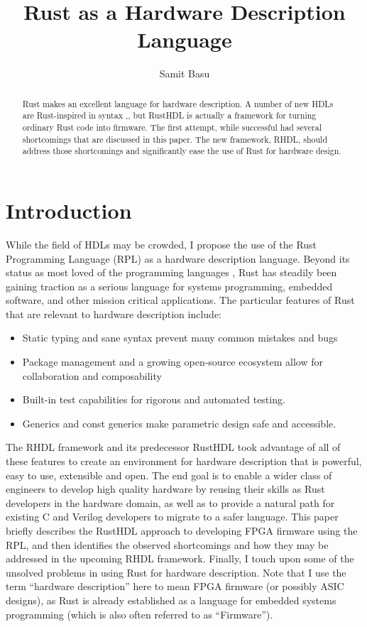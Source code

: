 \documentclass[sigplan,screen,sigconf]{acmart}
\author{Samit Basu}
\affiliation{
  basu.samit@gmail.com
  \country{Fremont CA, USA}
}
\begin{document}
\title{Rust as a Hardware Description Language}

\begin{abstract}
Rust \cite{b9} makes an excellent language for hardware description.  A number of new HDLs are 
Rust-inspired in syntax \cite{b1},\cite{b4},
but RustHDL\cite{b6} is actually a framework for turning ordinary Rust code into firmware.  The first attempt,
while successful had several shortcomings that are discussed in this paper.  The new framework, RHDL\cite{b10},
should address those shortcomings and significantly ease the use of Rust for hardware design.
\end{abstract}

\maketitle

\section{Introduction}

While the field of HDLs may be crowded, I propose the use of the Rust Programming Language (RPL)
as a hardware description language.  Beyond its status as most loved of the programming languages \cite{b0},
Rust has steadily been gaining traction as a serious language for systems programming, embedded 
software, and other mission critical applications.  The particular features of Rust that are 
relevant to hardware description include:
\begin{itemize}
\item Static typing and sane syntax prevent many common mistakes and bugs
\item Package management and a growing open-source ecosystem allow for collaboration and composability
\item Built-in test capabilities for rigorous and automated testing.
\item Generics and const generics make parametric design safe and accessible.
\end{itemize}
The RHDL framework and its predecessor RustHDL took advantage of all of these features to
create an environment for hardware description that is powerful, easy to use, extensible and
open.  The end goal is to enable a wider class of engineers to develop high quality hardware
by reusing their skills as Rust developers in the hardware domain, as well as to provide a natural path for existing C and Verilog developers to migrate to a safer language.  This paper briefly describes
the RustHDL approach to developing FPGA firmware using the RPL, and then identifies the
observed shortcomings and how they may be addressed in the upcoming RHDL framework.  
Finally, I touch upon some of the unsolved problems in using Rust for hardware description.  Note 
that I use the term ``hardware description'' here to mean FPGA firmware (or possibly ASIC designs), 
as Rust is already established as a language for embedded systems programming (which is also often
referred to as ``Firmware'').  
\end{document}
